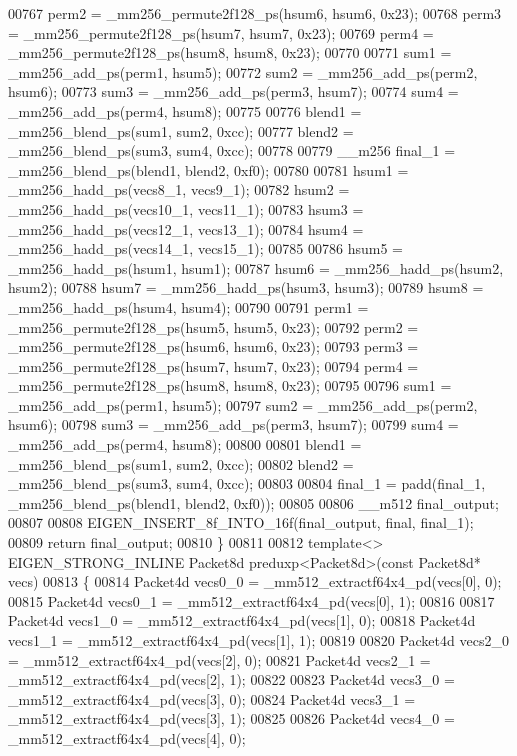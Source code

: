 \begin{DoxyCode}
00767   perm2 = \_mm256\_permute2f128\_ps(hsum6, hsum6, 0x23);
00768   perm3 = \_mm256\_permute2f128\_ps(hsum7, hsum7, 0x23);
00769   perm4 = \_mm256\_permute2f128\_ps(hsum8, hsum8, 0x23);
00770 
00771   sum1 = \_mm256\_add\_ps(perm1, hsum5);
00772   sum2 = \_mm256\_add\_ps(perm2, hsum6);
00773   sum3 = \_mm256\_add\_ps(perm3, hsum7);
00774   sum4 = \_mm256\_add\_ps(perm4, hsum8);
00775 
00776   blend1 = \_mm256\_blend\_ps(sum1, sum2, 0xcc);
00777   blend2 = \_mm256\_blend\_ps(sum3, sum4, 0xcc);
00778 
00779   \_\_m256 final\_1 = \_mm256\_blend\_ps(blend1, blend2, 0xf0);
00780 
00781   hsum1 = \_mm256\_hadd\_ps(vecs8\_1, vecs9\_1);
00782   hsum2 = \_mm256\_hadd\_ps(vecs10\_1, vecs11\_1);
00783   hsum3 = \_mm256\_hadd\_ps(vecs12\_1, vecs13\_1);
00784   hsum4 = \_mm256\_hadd\_ps(vecs14\_1, vecs15\_1);
00785 
00786   hsum5 = \_mm256\_hadd\_ps(hsum1, hsum1);
00787   hsum6 = \_mm256\_hadd\_ps(hsum2, hsum2);
00788   hsum7 = \_mm256\_hadd\_ps(hsum3, hsum3);
00789   hsum8 = \_mm256\_hadd\_ps(hsum4, hsum4);
00790 
00791   perm1 = \_mm256\_permute2f128\_ps(hsum5, hsum5, 0x23);
00792   perm2 = \_mm256\_permute2f128\_ps(hsum6, hsum6, 0x23);
00793   perm3 = \_mm256\_permute2f128\_ps(hsum7, hsum7, 0x23);
00794   perm4 = \_mm256\_permute2f128\_ps(hsum8, hsum8, 0x23);
00795 
00796   sum1 = \_mm256\_add\_ps(perm1, hsum5);
00797   sum2 = \_mm256\_add\_ps(perm2, hsum6);
00798   sum3 = \_mm256\_add\_ps(perm3, hsum7);
00799   sum4 = \_mm256\_add\_ps(perm4, hsum8);
00800 
00801   blend1 = \_mm256\_blend\_ps(sum1, sum2, 0xcc);
00802   blend2 = \_mm256\_blend\_ps(sum3, sum4, 0xcc);
00803 
00804   final\_1 = padd(final\_1, \_mm256\_blend\_ps(blend1, blend2, 0xf0));
00805 
00806   \_\_m512 final\_output;
00807 
00808   EIGEN\_INSERT\_8f\_INTO\_16f(final\_output, \textcolor{keyword}{final}, final\_1);
00809   \textcolor{keywordflow}{return} final\_output;
00810 \}
00811 
00812 \textcolor{keyword}{template}<> EIGEN\_STRONG\_INLINE Packet8d preduxp<Packet8d>(\textcolor{keyword}{const} Packet8d* vecs)
00813 \{
00814   Packet4d vecs0\_0 = \_mm512\_extractf64x4\_pd(vecs[0], 0);
00815   Packet4d vecs0\_1 = \_mm512\_extractf64x4\_pd(vecs[0], 1);
00816 
00817   Packet4d vecs1\_0 = \_mm512\_extractf64x4\_pd(vecs[1], 0);
00818   Packet4d vecs1\_1 = \_mm512\_extractf64x4\_pd(vecs[1], 1);
00819 
00820   Packet4d vecs2\_0 = \_mm512\_extractf64x4\_pd(vecs[2], 0);
00821   Packet4d vecs2\_1 = \_mm512\_extractf64x4\_pd(vecs[2], 1);
00822 
00823   Packet4d vecs3\_0 = \_mm512\_extractf64x4\_pd(vecs[3], 0);
00824   Packet4d vecs3\_1 = \_mm512\_extractf64x4\_pd(vecs[3], 1);
00825 
00826   Packet4d vecs4\_0 = \_mm512\_extractf64x4\_pd(vecs[4], 0);

\end{DoxyCode}
